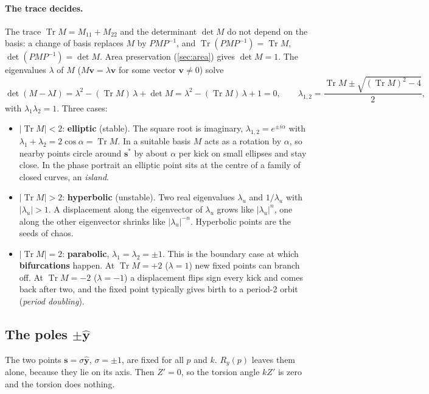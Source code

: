 \documentclass[11pt,a4paper]{article}
\newcommand{\vs}{\bm{s}}
\newcommand{\Tr}{\operatorname{Tr}}
\begin{document}
\paragraph{The trace decides.} The trace $\Tr M = M_{11} + M_{22}$ and the determinant $\det M$ do not depend on the
basis: a change of basis replaces $M$ by $PMP^{-1}$, and $\Tr(PMP^{-1}) = \Tr M$, $\det(PMP^{-1}) = \det M$. Area
preservation (\cref{sec:area}) gives $\det M = 1$. The eigenvalues $\lambda$ of $M$ ($M\bm v = \lambda\bm v$ for some
vector $\bm v\ne0$) solve
\begin{equation*}
  \det(M - \lambda I) = \lambda^2 - (\Tr M)\,\lambda + \det M = \lambda^2 - (\Tr M)\,\lambda + 1 = 0,
  \qquad
  \lambda_{1,2} = \frac{\Tr M \pm \sqrt{(\Tr M)^2 - 4}}{2},
\end{equation*}
with $\lambda_1\lambda_2 = 1$. Three cases:
\begin{itemize}
  \item $|\Tr M| < 2$: \textbf{elliptic} (stable). The square root is imaginary, $\lambda_{1,2} = e^{\pm i\alpha}$ with
  $\lambda_1 + \lambda_2 = 2\cos\alpha = \Tr M$. In a suitable basis $M$ acts as a rotation by $\alpha$, so nearby
  points circle around $\vs^*$ by about $\alpha$ per kick on small ellipses and stay close. In the phase portrait an
  elliptic point sits at the centre of a family of closed curves, an \emph{island}.
  \item $|\Tr M| > 2$: \textbf{hyperbolic} (unstable). Two real eigenvalues $\lambda_u$ and $1/\lambda_u$ with
  $|\lambda_u| > 1$. A displacement along the eigenvector of $\lambda_u$ grows like $|\lambda_u|^n$, one along the other
  eigenvector shrinks like $|\lambda_u|^{-n}$. Hyperbolic points are the seeds of chaos.
  \item $|\Tr M| = 2$: \textbf{parabolic}, $\lambda_1 = \lambda_2 = \pm1$. This is the boundary case at which
  \textbf{bifurcations} happen. At $\Tr M = +2$ ($\lambda = 1$) new fixed points can branch off. At $\Tr M = -2$
  ($\lambda = -1$) a displacement flips sign every kick and comes back after two, and the fixed point typically gives
  birth to a period-2 orbit (\emph{period doubling}).
\end{itemize}

\subsection{The poles \texorpdfstring{$\pm\hat{\bm y}$}{+-y}}\label{sec:poles}

The two points $\vs = \sigma\hat{\bm y}$, $\sigma = \pm1$, are fixed for all $p$ and $k$. $R_y(p)$ leaves them alone,
because they lie on its axis. Then $Z' = 0$, so the torsion angle $kZ'$ is zero and the torsion does nothing.
\end{document}
